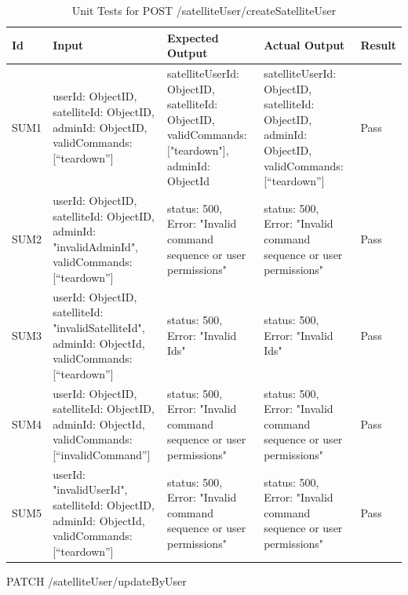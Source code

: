 \documentclass[12pt, titlepage]{article}
\begin{document}
\begin{center}
\begin{longtable}{|p{1cm} | p{3cm} |p{2cm}| p{2cm} |p{2cm}|}
\caption{Unit Tests for \newline POST /satelliteUser/createSatelliteUser}
\hline
\textbf{Id}  & \textbf{Input} & \textbf{Expected Output} & \textbf{Actual Output} & \textbf{Result} \\
\hline
SUM1 &  { userId: ObjectID,
satelliteId: ObjectID,
adminId: ObjectID,
validCommands: [“teardown”] } & { satelliteUserId: ObjectID,
satelliteId: ObjectID,
validCommands: ["teardown"],
adminId: ObjectId } & { satelliteUserId: ObjectID,
satelliteId: ObjectID,
adminId: ObjectID,
validCommands: [“teardown”] } & Pass
\\
\hline
SUM2 &  { userId: ObjectID,
satelliteId: ObjectID, adminId: "invalidAdminId",
validCommands: [“teardown”] } 
& { status: 500,
Error: "Invalid command sequence or user permissions" }
 & { status: 500,
Error: "Invalid command sequence or user permissions" }
 & Pass
\\
\hline
SUM3 &  { userId: ObjectID,
satelliteId: "invalidSatelliteId",
adminId: ObjectId,
validCommands: [“teardown”] }
 & { status: 500,
Error: "Invalid Ids" }
 & { status: 500,
Error: "Invalid Ids" }
 & Pass
\\
\hline
SUM4 &  { userId: ObjectID,
satelliteId: ObjectID,
adminId: ObjectId,
validCommands: [“invalidCommand”] }
 & { status: 500,
Error: "Invalid command sequence or user permissions" }
 & { status: 500,
Error: "Invalid command sequence or user permissions" }
 & Pass
\\
\hline
SUM5 &  { userId: "invalidUserId",
satelliteId: ObjectID,
adminId: ObjectId,
validCommands: [“teardown”] }
 & { status: 500,
Error: "Invalid command sequence or user permissions" }
 & { status: 500,
Error: "Invalid command sequence or user permissions" }
 & Pass
\\
\hline

\end{longtable}

\end{center}
PATCH /satelliteUser/updateByUser
\end{document}
